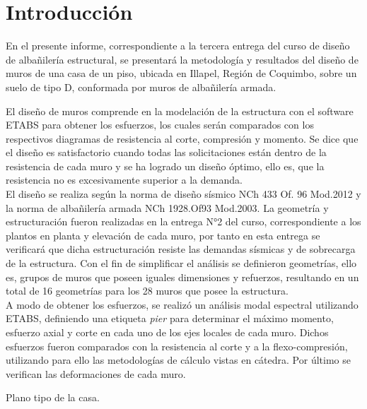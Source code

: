 \newpage
\section{Introducción}

En el presente informe, correspondiente a la tercera entrega del curso de diseño de albañilería estructural, se presentará la metodología y resultados del diseño de muros de una casa de un piso, ubicada en Illapel, Región de Coquimbo, sobre un suelo de tipo D, conformada por muros de albañilería armada.


El diseño de muros comprende en la modelación de la estructura con el software ETABS para obtener los esfuerzos, los cuales serán comparados con los respectivos diagramas de resistencia al corte, compresión y momento. Se dice que el diseño es satisfactorio cuando todas las solicitaciones están dentro de la resistencia de cada muro y se ha logrado un diseño óptimo, ello es, que la resistencia no es excesivamente superior a la demanda. \\

El diseño se realiza según la norma de diseño sísmico NCh 433 Of. 96 Mod.2012 y la norma de albañilería armada NCh 1928.Of93 Mod.2003. La geometría y estructuración fueron realizadas en la entrega N°2 del curso, correspondiente a los plantos en planta y elevación de cada muro, por tanto en esta entrega se verificará que dicha estructuración resiste las demandas sísmicas y de sobrecarga de la estructura. Con el fin de simplificar el análisis se definieron geometrías, ello es, grupos de muros que poseen iguales dimensiones y refuerzos, resultando en un total de 16 geometrías para los 28 muros que posee la estructura. \\

A modo de obtener los esfuerzos, se realizó un análisis modal espectral utilizando ETABS, definiendo una etiqueta \textit{pier} para determinar el máximo momento, esfuerzo axial y corte en cada uno de los ejes locales de cada muro. Dichos esfuerzos fueron comparados con la resistencia al corte y a la flexo-compresión, utilizando para ello las metodologías de cálculo vistas en cátedra. Por último se verifican las deformaciones de cada muro.

\begin{images}[\label{esqplanos}]{Plano tipo de la casa.}
\end{images}